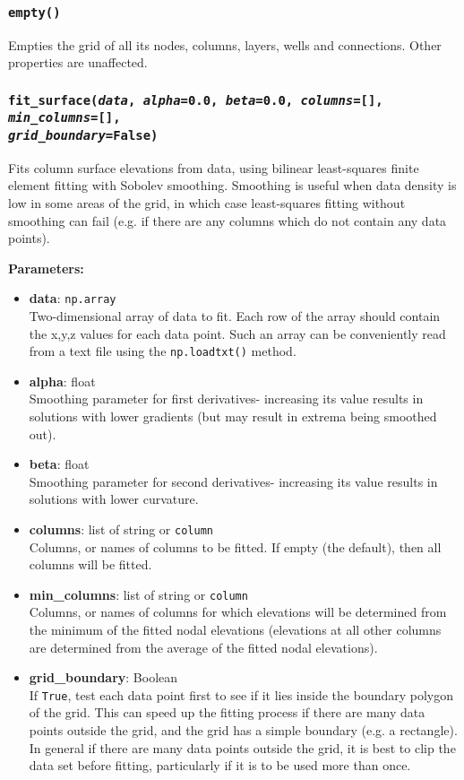 \subsubsection{\texttt{empty()}}

Empties the grid of all its nodes, columns, layers, wells and connections.  Other properties are unaffected.

\subsubsection{\texttt{fit\_surface(\emph{data}, \emph{alpha}=0.0, \emph{beta}=0.0, \emph{columns}=[], \emph{min\_columns}=[], \\
    \emph{grid\_boundary}=False)}}

Fits column surface elevations from data, using bilinear least-squares finite element fitting with Sobolev smoothing.  Smoothing is useful when data density is low in some areas of the grid, in which case least-squares fitting without smoothing can fail (e.g. if there are any columns which do not contain any data points).

\textbf{Parameters:}
\begin{itemize}
\item \textbf{data}: \texttt{np.array}\\
  Two-dimensional array of data to fit.  Each row of the array should contain the x,y,z values for each data point.  Such an array can be conveniently read from a text file using the \texttt{np.loadtxt()} method.
\item \textbf{alpha}: float\\
  Smoothing parameter for first derivatives- increasing its value results in solutions with lower gradients (but may result in extrema being smoothed out).
\item \textbf{beta}: float\\
  Smoothing parameter for second derivatives- increasing its value results in solutions with lower curvature.
\item \textbf{columns}: list of string or \texttt{column}\\
  Columns, or names of columns to be fitted.  If empty (the default), then all columns will be fitted.
\item \textbf{min\_columns}: list of string or \texttt{column}\\
  Columns, or names of columns for which elevations will be determined from the minimum of the fitted nodal elevations (elevations at all other columns are determined from the average of the fitted nodal elevations).
\item \textbf{grid\_boundary}: Boolean\\
  If \texttt{True}, test each data point first to see if it lies inside the boundary polygon of the grid.  This can speed up the fitting process if there are many data points outside the grid, and the grid has a simple boundary (e.g. a rectangle).  In general if there are many data points outside the grid, it is best to clip the data set before fitting, particularly if it is to be used more than once.
\end{itemize}

